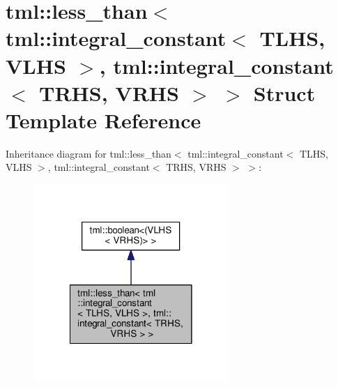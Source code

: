 \hypertarget{structtml_1_1less__than_3_01tml_1_1integral__constant_3_01_t_l_h_s_00_01_v_l_h_s_01_4_00_01tml_124003ca81023b8d204f90af104137eef}{\section{tml\+:\+:less\+\_\+than$<$ tml\+:\+:integral\+\_\+constant$<$ T\+L\+H\+S, V\+L\+H\+S $>$, tml\+:\+:integral\+\_\+constant$<$ T\+R\+H\+S, V\+R\+H\+S $>$ $>$ Struct Template Reference}
\label{structtml_1_1less__than_3_01tml_1_1integral__constant_3_01_t_l_h_s_00_01_v_l_h_s_01_4_00_01tml_124003ca81023b8d204f90af104137eef}
}


Inheritance diagram for tml\+:\+:less\+\_\+than$<$ tml\+:\+:integral\+\_\+constant$<$ T\+L\+H\+S, V\+L\+H\+S $>$, tml\+:\+:integral\+\_\+constant$<$ T\+R\+H\+S, V\+R\+H\+S $>$ $>$\+:
\nopagebreak
\begin{figure}[H]
\begin{center}
\leavevmode
\includegraphics[width=210pt]{structtml_1_1less__than_3_01tml_1_1integral__constant_3_01_t_l_h_s_00_01_v_l_h_s_01_4_00_01tml_16c7ee54488210d537e058de38d536268}
\end{center}
\end{figure}


